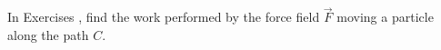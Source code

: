{\noindent In Exercises}
{, find the work performed by the force field $\vec F$ moving a particle along the path $C$.}
